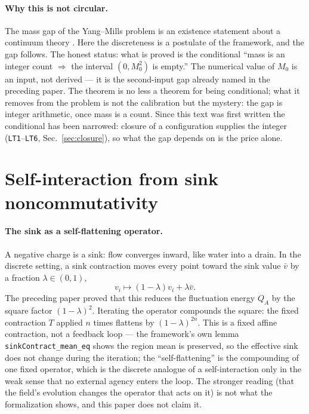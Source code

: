 \documentclass[aps,prd,preprint,superscriptaddress,amsmath,amssymb]{revtex4-2}
\begin{document}
\paragraph{Why this is not circular.}
The mass gap of the Yang--Mills problem is an existence statement
about a continuum theory \cite{jaffe2000yang}.  Here the discreteness
is a postulate of the framework, and the gap follows.  The honest
status: what is proved is the conditional ``mass is an integer count
$\Rightarrow$ the interval $(0,M_0^2)$ is empty.''  The numerical
value of $M_0$ is an input, not derived --- it is the second-input
gap already named in the preceding paper.  The theorem is no less a
theorem for being conditional; what it removes from the problem is
not the calibration but the mystery: the gap is integer arithmetic,
once mass is a count.  Since this text was first written the conditional
has been narrowed: closure of a configuration supplies the integer
(\texttt{LT1}--\texttt{LT6}, Sec.~\ref{sec:closure}), so what the gap
depends on is the price alone.

\section{Self-interaction from sink noncommutativity}
\label{sec:selfinteraction}

\paragraph{The sink as a self-flattening operator.}
A negative charge is a sink: flow converges inward, like water into
a drain.  In the discrete
setting, a sink contraction moves every point toward the sink value
$\bar v$ by a fraction $\lambda\in(0,1)$,
\begin{equation}
v_i\mapsto (1-\lambda)v_i+\lambda\bar v .
\end{equation}
The preceding paper proved that this reduces the fluctuation energy
$Q_A$ by the square factor $(1-\lambda)^2$.  Iterating the operator
compounds the square: the fixed contraction $T$ applied $n$ times
flattens by $(1-\lambda)^{2n}$.  This is a fixed affine contraction,
not a feedback loop --- the framework's own lemma
\texttt{sinkContract\_mean\_eq} shows the region mean is preserved,
so the effective sink does not change during the iteration; the
``self-flattening'' is the compounding of one fixed operator, which
is the discrete analogue of a self-interaction only in the weak sense
that no external agency enters the loop.  The stronger reading (that
the field's evolution changes the operator that acts on it) is not
what the formalization shows, and this paper does not claim it.
\end{document}
